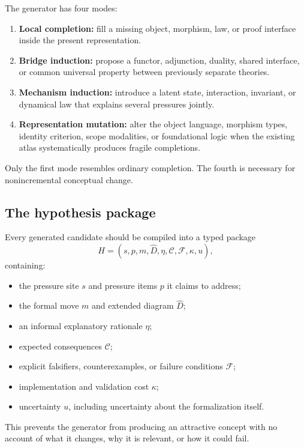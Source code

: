 \documentclass[11pt]{article}
\begin{document}
The generator has four modes:
\begin{enumerate}
  \item \textbf{Local completion:} fill a missing object, morphism, law, or proof interface inside the
  present representation.
  \item \textbf{Bridge induction:} propose a functor, adjunction, duality, shared interface, or common
  universal property between previously separate theories.
  \item \textbf{Mechanism induction:} introduce a latent state, interaction, invariant, or dynamical law
  that explains several pressures jointly.
  \item \textbf{Representation mutation:} alter the object language, morphism types, identity criterion,
  scope modalities, or foundational logic when the existing atlas systematically produces fragile
  completions.
\end{enumerate}

Only the first mode resembles ordinary completion. The fourth is necessary for nonincremental
conceptual change.

\subsection{The hypothesis package}

Every generated candidate should be compiled into a typed package
\begin{equation}
H=(s,p,m,\widehat D,\eta,\mathcal{C},\mathcal{F},\kappa,u),
\end{equation}
containing:
\begin{itemize}
  \item the pressure site $s$ and pressure items $p$ it claims to address;
  \item the formal move $m$ and extended diagram $\widehat D$;
  \item an informal explanatory rationale $\eta$;
  \item expected consequences $\mathcal{C}$;
  \item explicit falsifiers, counterexamples, or failure conditions $\mathcal{F}$;
  \item implementation and validation cost $\kappa$;
  \item uncertainty $u$, including uncertainty about the formalization itself.
\end{itemize}

This prevents the generator from producing an attractive concept with no account of what it changes,
why it is relevant, or how it could fail.
\end{document}
